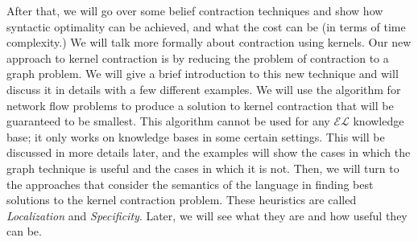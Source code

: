 After that, we will go over some belief contraction techniques and show how syntactic optimality can be achieved, and what the cost can be (in terms of time complexity.) We will talk more formally about contraction using kernels. Our new approach to kernel contraction is by reducing the problem of contraction to a graph problem. We will give a brief introduction to this new technique and will discuss it in details with a few different examples. We will use the algorithm for network flow problems to produce a solution to kernel contraction that will be guaranteed to be smallest. This algorithm cannot be used for any $\mathcal{EL}$ knowledge base; it only works on knowledge bases in some certain settings. This will be discussed in more details later, and the examples will show the cases in which the graph technique is useful and the cases in which it is not. Then, we will turn to the approaches that consider the semantics of the language in finding best solutions to the kernel contraction problem. These heuristics are called \textit{Localization} and \textit{Specificity}. Later, we will see what they are and how useful they can be.